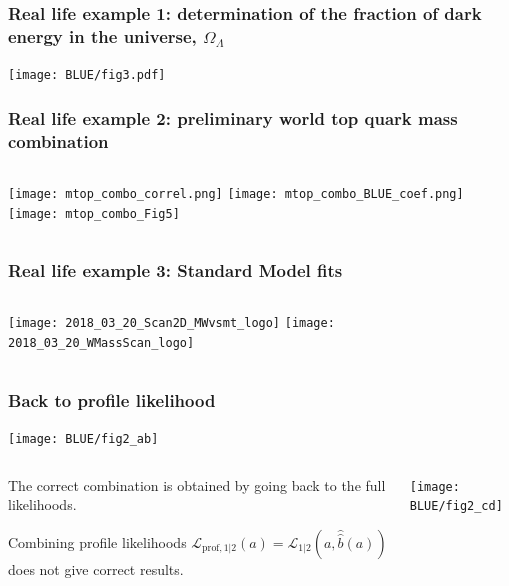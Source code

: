 \documentclass[9pt]{beamer}
\begin{document}
\begin{frame}
 \frametitle{Real life example 1: determination of the fraction of dark energy in the universe, $\Omega_\Lambda$}
 
 \centering
 \texttt{[image: BLUE/fig3.pdf]}
\end{frame}

\begin{frame}
 \frametitle{Real life example 2: preliminary world top quark mass combination}
 
 \begin{columns}
  \begin{column}{1.19\textwidth}
   \texttt{[image: mtop\_combo\_correl.png]}\hfill
 \texttt{[image: mtop\_combo\_BLUE\_coef.png]}\hfill
 \texttt{[image: mtop\_combo\_Fig5]}
  \end{column}
 \end{columns}

 
\end{frame}


\begin{frame}
 \frametitle{Real life example 3: Standard Model fits}
 
 \begin{columns}
  \begin{column}{1.15\textwidth}
 \texttt{[image: 2018\_03\_20\_Scan2D\_MWvsmt\_logo]}\hfill
 \texttt{[image: 2018\_03\_20\_WMassScan\_logo]}
 \end{column}
 \end{columns}
\end{frame}


\begin{frame}
 \frametitle{Back to profile likelihood}
 
 
 \hfill\texttt{[image: BLUE/fig2\_ab]}
 
 \begin{columns}
  \begin{column}{0.55\textwidth}
   The correct combination is obtained by going back to the full likelihoods.
   
   Combining profile likelihoods $\mathcal{L}_{\text{prof},1|2}(a) = \mathcal{L}_{1|2}(a,\hat{\hat{b}}(a))$ does not give correct results.
  \end{column}
  \begin{column}{0.37\textwidth}
   \texttt{[image: BLUE/fig2\_cd]}
  \end{column}
 \end{columns}

\end{frame}


\end{document}

